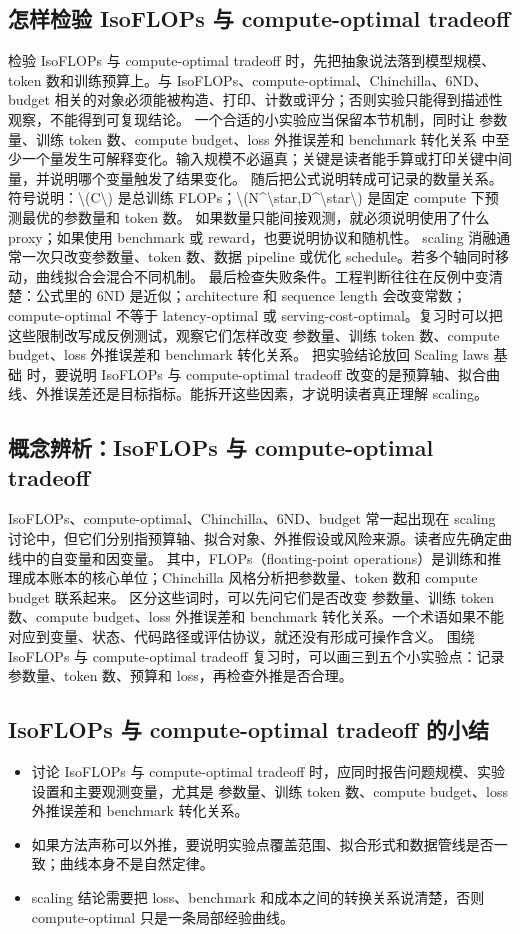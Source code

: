 \documentclass[a4paper]{article}
\begin{document}
\subsection{怎样检验 IsoFLOPs 与 compute-optimal tradeoff}
检验 IsoFLOPs 与 compute-optimal tradeoff 时，先把抽象说法落到模型规模、token 数和训练预算上。与 IsoFLOPs、compute-optimal、Chinchilla、6ND、budget 相关的对象必须能被构造、打印、计数或评分；否则实验只能得到描述性观察，不能得到可复现结论。
一个合适的小实验应当保留本节机制，同时让 参数量、训练 token 数、compute budget、loss 外推误差和 benchmark 转化关系 中至少一个量发生可解释变化。输入规模不必逼真；关键是读者能手算或打印关键中间量，并说明哪个变量触发了结果变化。
随后把公式说明转成可记录的数量关系。符号说明：\textbackslash{}(C\textbackslash{}) 是总训练 FLOPs；\textbackslash{}(N\textasciicircum{}\textbackslash{}star,D\textasciicircum{}\textbackslash{}star\textbackslash{}) 是固定 compute 下预测最优的参数量和 token 数。 如果数量只能间接观测，就必须说明使用了什么 proxy；如果使用 benchmark 或 reward，也要说明协议和随机性。
scaling 消融通常一次只改变参数量、token 数、数据 pipeline 或优化 schedule。若多个轴同时移动，曲线拟合会混合不同机制。
最后检查失败条件。工程判断往往在反例中变清楚：公式里的 6ND 是近似；architecture 和 sequence length 会改变常数；compute-optimal 不等于 latency-optimal 或 serving-cost-optimal。复习时可以把这些限制改写成反例测试，观察它们怎样改变 参数量、训练 token 数、compute budget、loss 外推误差和 benchmark 转化关系。
把实验结论放回 Scaling laws 基础 时，要说明 IsoFLOPs 与 compute-optimal tradeoff 改变的是预算轴、拟合曲线、外推误差还是目标指标。能拆开这些因素，才说明读者真正理解 scaling。
\subsection{概念辨析：IsoFLOPs 与 compute-optimal tradeoff}
IsoFLOPs、compute-optimal、Chinchilla、6ND、budget 常一起出现在 scaling 讨论中，但它们分别指预算轴、拟合对象、外推假设或风险来源。读者应先确定曲线中的自变量和因变量。
其中，FLOPs（floating-point operations）是训练和推理成本账本的核心单位；Chinchilla 风格分析把参数量、token 数和 compute budget 联系起来。
区分这些词时，可以先问它们是否改变 参数量、训练 token 数、compute budget、loss 外推误差和 benchmark 转化关系。一个术语如果不能对应到变量、状态、代码路径或评估协议，就还没有形成可操作含义。
围绕 IsoFLOPs 与 compute-optimal tradeoff 复习时，可以画三到五个小实验点：记录参数量、token 数、预算和 loss，再检查外推是否合理。
\subsection{IsoFLOPs 与 compute-optimal tradeoff 的小结}
\begin{itemize}
\item 讨论 IsoFLOPs 与 compute-optimal tradeoff 时，应同时报告问题规模、实验设置和主要观测变量，尤其是 参数量、训练 token 数、compute budget、loss 外推误差和 benchmark 转化关系。
\item 如果方法声称可以外推，要说明实验点覆盖范围、拟合形式和数据管线是否一致；曲线本身不是自然定律。
\item scaling 结论需要把 loss、benchmark 和成本之间的转换关系说清楚，否则 compute-optimal 只是一条局部经验曲线。
\end{itemize}
\end{document}
